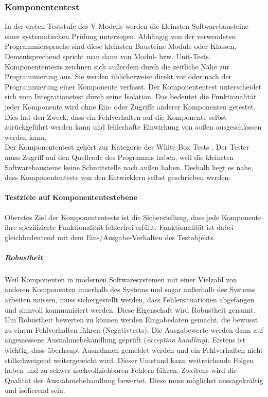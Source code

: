 \subsubsection{Komponententest}
In der ersten Teststufe des V-Modells werden die kleinsten Softwarebausteine einer systematischen Prüfung unterzogen. Abhängig von der verwendeten Programmiersprache sind diese kleinsten Bausteine Module oder Klassen. Dementsprechend spricht man dann von Modul- bzw. Unit-Tests.\\
Komponententests zeichnen sich außerdem durch die zeitliche Nähe zur Programmierung aus. Sie werden üblicherweise direkt vor oder nach der Programmierung einer Komponente verfasst. Der Komponententest unterscheidet sich vom Integrationstest durch seine Isolation. Das bedeutet die Funktionalität jeder Komponente wird ohne Ein- oder Zugriffe anderer Komponenten getestet. Dies hat den Zweck, dass ein Fehlverhalten auf die Komponente selbst zurückgeführt werden kann und fehlerhafte Einwirkung von außen ausgeschlossen werden kann.\\
Der Komponententest gehört zur Kategorie der White-Box Tests . Der Tester muss Zugriff auf den Quellcode des Programms haben, weil die kleinsten Softwarebausteine keine Schnittstelle nach außen haben. Deshalb liegt es nahe, dass Komponententests von den Entwicklern selbst geschrieben werden.

\paragraph{Testziele auf Komponententestebene}
Oberstes Ziel der Komponententests ist die Sicherstellung, dass jede Komponente ihre spezifizierte Funktionalität fehlerfrei erfüllt. Funktionalität ist dabei gleichbedeutend mit dem Ein-/Ausgabe-Verhalten des Testobjekts\cite{spillner_basiswissen_2012}.\\

\subparagraph{Robustheit} Weil Komponenten in modernen Softwaresystemen mit einer Vielzahl von anderen Komponenten innerhalb des Systems und sogar außerhalb des Systems arbeiten müssen, muss sichergestellt werden, dass Fehlersituationen abgefangen und sinnvoll kommuniziert werden. Diese Eigenschaft wird Robustheit genannt. Um Robustheit bewerten zu können werden Eingabedaten gemacht, die bewusst zu einem Fehlverhalten führen (Negativtests). Die Ausgabewerte werden dann auf angemessene Ausnahmebehandlung geprüft (\textit{exception handling}). Erstens ist wichtig, dass überhaupt Ausnahmen gemeldet werden und ein Fehlverhalten nicht stillschweigend weitergereicht wird. Dieser Umstand kann weitreichende Folgen haben und zu schwer nachvollziehbaren Fehlern führen. Zweitens wird die Qualität der Ausnahmebehandlung bewertet. Diese muss möglichst aussagekräftig und isolierend sein.

